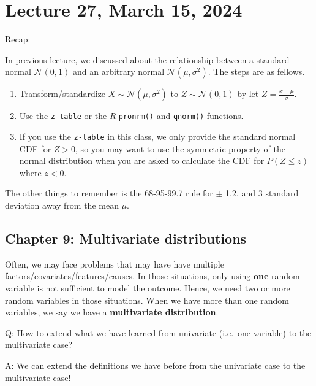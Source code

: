 \documentclass[
]{book}
\theoremstyle{definition}
\theoremstyle{definition}
\theoremstyle{definition}
\theoremstyle{definition}
\theoremstyle{remark}
\begin{document}
\chapter{Lecture 27, March 15, 2024}\label{lecture-27-march-15-2024}

\newcommand{\var}{\mathbb{V}ar}
\newcommand{\R}{\mathbb{R}}
\newcommand{\E}{\mathbb{E}}
\newcommand{\N}{\mathcal{N}}

Recap:

In previous lecture, we discussed about the relationship between a standard normal \(\mathcal{N}(0,1)\) and an arbitrary normal \(\mathcal{N}(\mu,\sigma^2)\). The steps are as fellows.

\begin{enumerate}
\def\labelenumi{\arabic{enumi}.}
\item
  Transform/standardize \(X\sim\mathcal{N}(\mu,\sigma^2)\) to \(Z\sim\mathcal{N}(0,1)\) by let \(Z=\frac{x-\mu}{\sigma}\).
\item
  Use the \texttt{z-table} or the \emph{R} \texttt{pronrm()} and \texttt{qnorm()} functions.
\item
  If you use the \texttt{z-table} in this class, we only provide the standard normal CDF for \(Z>0\), so you may want to use the symmetric property of the normal distribution when you are asked to calculate the CDF for \(P(Z\le z)\) where \(z<0\).
\end{enumerate}

The other things to remember is the 68-95-99.7 rule for \(\pm\) 1,2, and 3 standard deviation away from the mean \(\mu\).

\section{Chapter 9: Multivariate distributions}\label{chapter-9-multivariate-distributions}

Often, we may face problems that may have have multiple factors/covariates/features/causes. In those situations, only using \textbf{one} random variable is not sufficient to model the outcome. Hence, we need two or more random variables in those situations. When we have more than one random variables, we say we have a \textbf{multivariate distribution}.

Q: How to extend what we have learned from univariate (i.e.~one variable) to the multivariate case?

A: We can extend the definitions we have before from the univariate case to the multivariate case!
\end{document}
